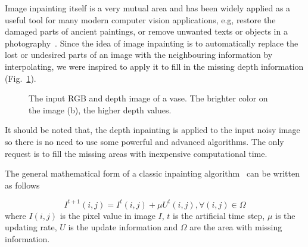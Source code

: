 Image inpainting itself is a very mutual area and has been widely applied as a useful tool for many modern computer vision applications, e.g, restore the damaged parts of ancient paintings, or remove unwanted texts or objects in a photography~\cite{bertalmio2000image}. 
Since the idea of image inpainting is to automatically replace the lost or undesired parts of an image with the neighbouring information by interpolating, we were inspired to apply it to fill in the missing depth information (Fig.~\ref{fig:inpainting1}).

\begin{figure}[!htbp]
\centering
{}
\caption{The input RGB and depth image of a vase. The brighter color on the image (b), the higher depth values.}
\label{fig:inpainting1}
\end{figure}

It should be noted that, the depth inpainting is applied to the input noisy image so there is no need to use some powerful and advanced algorithms.
The only request is to fill the missing areas with inexpensive computational time.

The general mathematical form of a classic inpainting algorithm~\cite{bertalmio2000image} can be written as follows

\begin{equation}\label{eq:method_inpaint1}
I^{t+1}(i,j) = I^{t}(i,j) + \mu U^{t}(i,j), \forall(i,j)\in \Omega
\end{equation}
where $I(i,j)$ is the pixel value in image $I$, $t$ is the artificial time step, $\mu$ is the updating rate, $U$ is the update information and $\Omega$ are the area with missing information.

